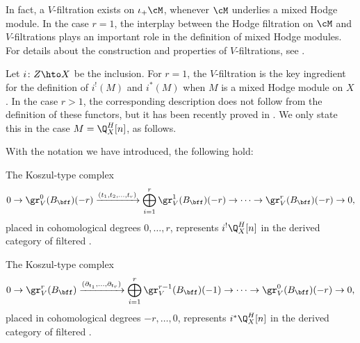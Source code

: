 In fact, a $V$-filtration exists on $\iota_+\cM$, whenever $\cM$ underlies
a mixed Hodge module. In the case $r=1$, the interplay between the Hodge filtration on $\cM$ and $V$-filtrations plays an important role in the definition of mixed Hodge modules. For details about the construction and properties of $V$-filtrations, see \cite{BMS}.

Let $i\colon Z\hto X$ be the inclusion. For $r=1$, the $V$-filtration is the key ingredient for the definition of $i^!(M)$ and $i^*(M)$ when $M$ is a
mixed Hodge module on $X$. In the case $r>1$, the corresponding description does not follow from the definition of these functors, but it has been recently
proved in \cite[Th.\,1.2]{CD}. We only state this in the case $M=\Q_X^H[n]$, as follows.

\begin{thm}\label{thm_CD}
With the notation we have introduced, the following hold:
\begin{enumeratei}
\item\label{thm_CDi}
The Koszul-type complex
\[0\to \gr^0_V(B_\bff)(-r) \xrightarrow{(t_1,t_2,\dots,t_r)} \bigoplus^r_{i=1}\gr^1_V(B_\bff)(-r) \to \cdots \to
\gr^r_V(B_\bff)(-r)\to 0,\]
placed in cohomological degrees $0,\ldots,r$, represents $i^!\Q_X^H[n]$ in the derived category of filtered \DXmodules.
\item\label{thm_CDii}
The Koszul-type complex
\[0\to \gr_V^r(B_{\bff})\xrightarrow{(\partial_{t_1},\dots,\partial_{t_r})} \bigoplus_{i=1}^r\gr_V^{r-1}(B_{\bff})(-1)\to\cdots\to \gr_V^0(B_{\bff})(-r)\to 0,\]
placed in cohomological degrees $-r,\ldots,0$, represents $i^*\Q_X^H[n]$ in the derived category of filtered \DXmodules.
\end{enumeratei}
\end{thm}

